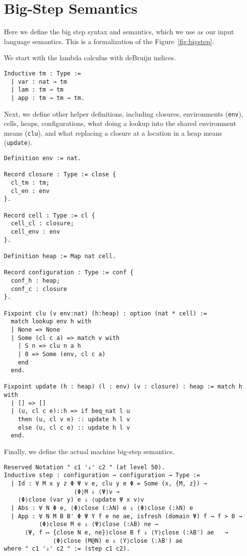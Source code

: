 \section{Big-Step \ce Semantics}
Here we define the big step syntax and semantics, which we use as our input
language semantics. This is a formalization of the Figure~\ref{fig:bigstep}.

We start with the lambda calculus with deBruijn indices.

\begin{verbatim}
Inductive tm : Type := 
  | var : nat → tm 
  | lam : tm → tm
  | app : tm → tm → tm.
\end{verbatim}

Next, we define other helper definitions, including closures, environments
(\texttt{env}), cells, heaps, configurations, what doing a lookup into the
shared environment means (\texttt{clu}), and what replacing a closure at a
location in a heap means (\texttt{update}).

\begin{verbatim}
Definition env := nat.

Record closure : Type := close {
  cl_tm : tm;
  cl_en : env
}.

Record cell : Type := cl {
  cell_cl : closure;
  cell_env : env
}.

Definition heap := Map nat cell.

Record configuration : Type := conf {
  conf_h : heap;
  conf_c : closure
}.

Fixpoint clu (v env:nat) (h:heap) : option (nat * cell) := 
  match lookup env h with
  | None => None
  | Some (cl c a) => match v with
    | S n => clu n a h
    | 0 => Some (env, cl c a)
    end
  end.

Fixpoint update (h : heap) (l : env) (v : closure) : heap := match h with 
  | [] => []
  | (u, cl c e)::h => if beq_nat l u 
    then (u, cl v e) :: update h l v 
    else (u, cl c e) :: update h l v
  end.
\end{verbatim}
Finally, we define the actual machine big-step semantics.
\begin{verbatim}
Reserved Notation " c1 '⇓' c2 " (at level 50).
Inductive step : configuration → configuration → Type :=
  | Id : ∀ M x y z Φ Ψ v e, clu y e Φ = Some (x, {M, z}) → 
                    ⟨Φ⟩M ⇓ ⟨Ψ⟩v →
    ⟨Φ⟩close (var y) e ⇓ ⟨update Ψ x v⟩v
  | Abs : ∀ N Φ e, ⟨Φ⟩close (:λN) e ⇓ ⟨Φ⟩close (:λN) e
  | App : ∀ N M B B' Φ Ψ Υ f e ne ae, isfresh (domain Ψ) f → f > 0 →
          ⟨Φ⟩close M e ⇓ ⟨Ψ⟩close (:λB) ne → 
      ⟨Ψ, f ↦ {close N e, ne}⟩close B f ⇓ ⟨Υ⟩close (:λB') ae   →
              ⟨Φ⟩close (M@N) e ⇓ ⟨Υ⟩close (:λB') ae
where " c1 '⇓' c2 " := (step c1 c2).
\end{verbatim}

